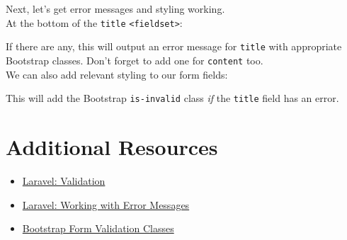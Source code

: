 Next, let's get error messages and styling working.
\\

At the bottom of the \texttt{title} \texttt{<fieldset>}:


If there are any, this will output an error message for \texttt{title} with appropriate Bootstrap classes. Don't forget to add one for \texttt{content} too.
\\

We can also add relevant styling to our form fields:


This will add the Bootstrap \texttt{is-invalid} class \textit{if} the \texttt{title} field has an error.


\section{Additional Resources}

\begin{itemize}[leftmargin=*]
    \item \href{http://laravel.com/docs/master/validation}{Laravel: Validation}
    \item \href{http://laravel.com/docs/master/validation#working-with-error-messages}{Laravel: Working with Error Messages}
    \item \href{https://getbootstrap.com/docs/4.0/components/forms/#server-side}{Bootstrap Form Validation Classes}
\end{itemize}
